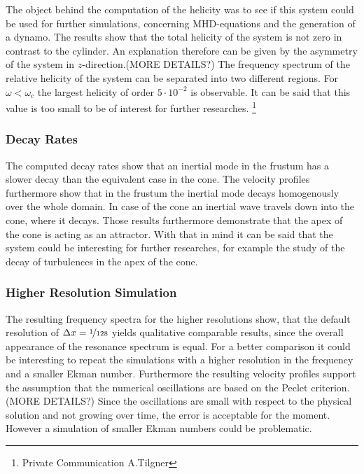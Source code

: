 The object behind the computation of the helicity was to see if this system could be used
for further simulations, concerning MHD-equations and the generation of a dynamo.
The results show that the total helicity of the system is not zero in contrast to the cylinder.
An explanation therefore can be given by the asymmetry of the system in $z$-direction.(MORE DETAILS?)
The frequency spectrum of the relative helicity of the  system can be separated into two different regions.
For $\omega<\omega_c$ the largest helicity of order $5\cdot10^{-2}$ is observable.
It can be said that this value is too small to be of interest for further researches.
\footnote{Private Communication A.Tilgner}


\subsubsection{Decay Rates}

The computed decay rates show that an inertial mode in the frustum has a slower decay
than the equivalent case in the cone.
The velocity profiles furthermore show that in the frustum the inertial mode decays homogenously over the whole domain.
In case of the cone an inertial wave travels down into the cone, where it decays.
Those results furthermore demonstrate that the apex of the cone is acting as an attractor.
With that in mind it can be said that the system could be interesting for further researches,
for example the study of the decay of turbulences in the apex of the cone.

\subsubsection{Higher Resolution Simulation}

The resulting frequency spectra for the higher resolutions show,
that the default resolution of ${\Delta x = \nicefrac{1}{128}}$ yields
qualitative comparable results, since the overall appearance of the resonance spectrum
is equal.
For a better comparison it could be interesting to repeat the simulations with a
higher resolution in the frequency  and a smaller Ekman number.
Furthermore the resulting velocity profiles support the assumption
that the numerical oscillations are based on the Peclet criterion.(MORE DETAILS?)
Since the oscillations are small with respect to the physical solution and not
growing over time, the error is acceptable for the moment.
However a simulation of smaller Ekman numbers could be problematic.
\clearpage

